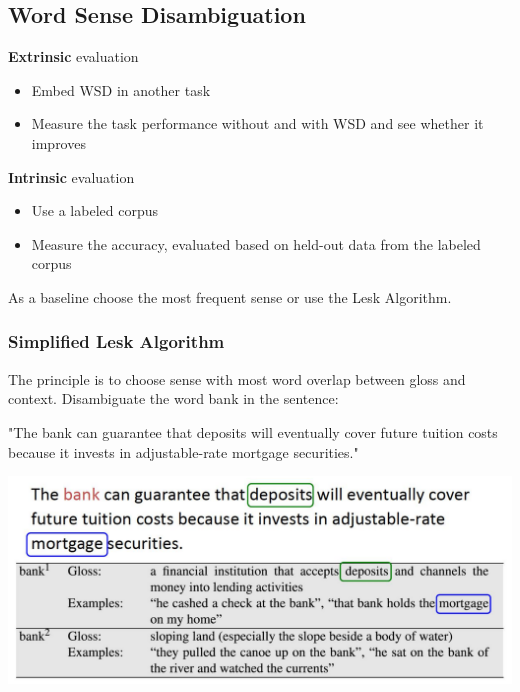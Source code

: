 \documentclass[11pt]{article}
\begin{document}
\subsection{Word Sense Disambiguation}
\textbf{Extrinsic} evaluation
\begin{itemize}
	\item Embed WSD in another task
	\item Measure the task performance without and with WSD and see whether it improves
\end{itemize}
\textbf{Intrinsic} evaluation
\begin{itemize}
	\item Use a labeled corpus
	\item Measure the accuracy, evaluated based on held-out data from the labeled corpus
\end{itemize}
As a baseline choose the most frequent sense or use the Lesk Algorithm.

\subsubsection{Simplified Lesk Algorithm}
The principle is to choose sense with most word overlap between gloss and context. Disambiguate the word bank in the sentence:

"The bank can guarantee that deposits will eventually cover future tuition costs because it invests in adjustable-rate mortgage securities."

\begin{center}
	\includegraphics[width=0.7\linewidth]{img/simplified_lesk_algorithm}
\end{center}
\end{document}
